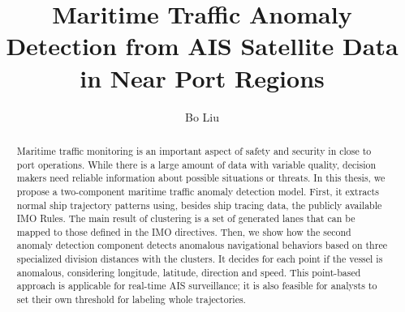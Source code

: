 \documentclass[12pt,glossary]{dalcsthesis}
\begin{document}
\mcs  %
\title{Maritime Traffic Anomaly Detection from AIS Satellite Data in Near Port Regions}
\author{Bo Liu}




\frontmatter



\begin{abstract}
Maritime traffic monitoring is an important aspect of safety and security in close to port operations. While there is a large amount of data with variable quality, decision makers need reliable information about possible situations or threats. In this thesis, we propose a two-component maritime traffic anomaly detection model. First, it extracts normal ship trajectory patterns using, besides ship tracing data, the publicly available IMO Rules. The main result of clustering is a set of generated lanes that can be mapped to those defined in the IMO directives. Then, we show how the second anomaly detection component detects anomalous navigational behaviors based on three specialized division distances with the clusters. It decides for each point if the vessel is anomalous, considering longitude, latitude, direction and speed. This point-based approach is applicable for real-time AIS surveillance; it is also feasible for analysts to set their own threshold for labeling whole trajectories.


\end{abstract}
\end{document}
